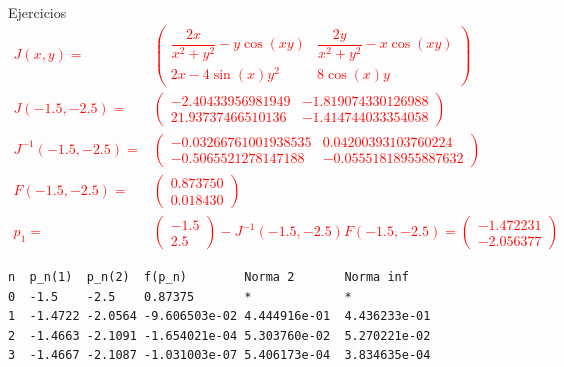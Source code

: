 \begin{frame}[fragile]{Ejercicios}
\small
\textcolor{red}{
\begin{align*}
J(x,y)=&\begin{pmatrix}
\dfrac{2x}{x^2+y^2}-y\cos(xy) & \dfrac{2y}{x^2+y^2}-x\cos(xy)\\
2x-4\sin(x)y^2 & 8 \cos(x)y 
\end{pmatrix}\\
J(-1.5,-2.5)=&
\begin{pmatrix}
 - 2.40433956981949  & - 1.819074330126988\\
 21.93737466510136   & - 1.414744033354058
\end{pmatrix}\\
J^{-1}(-1.5,-2.5)=&
\begin{pmatrix}
-0.03266761001938535 &  0.04200393103760224\\
-0.5065521278147188 &  - 0.05551818955887632
\end{pmatrix}\\
F(-1.5,-2.5)=&
\begin{pmatrix}
0.873750\\
0.018430
\end{pmatrix}\\
p_1=&
\begin{pmatrix}
-1.5\\
2.5
\end{pmatrix}
-J^{-1}(-1.5,-2.5)F(-1.5,-2.5)=
\begin{pmatrix}
-1.472231\\
-2.056377
\end{pmatrix}
\end{align*}}
\small
\begin{lstlisting}[style=mystyle,backgroundcolor=\color{gray!30}]
n  p_n(1)  p_n(2)  f(p_n)        Norma 2       Norma inf
0  -1.5    -2.5    0.87375       *             *
1  -1.4722 -2.0564 -9.606503e-02 4.444916e-01  4.436233e-01
2  -1.4663 -2.1091 -1.654021e-04 5.303760e-02  5.270221e-02
3  -1.4667 -2.1087 -1.031003e-07 5.406173e-04  3.834635e-04
\end{lstlisting}
\normalsize
\end{frame}